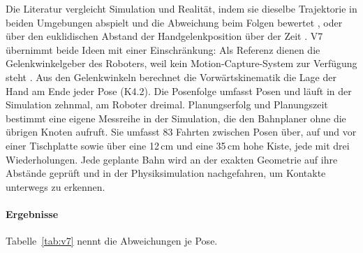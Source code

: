 Die Literatur vergleicht Simulation und Realität, indem sie dieselbe Trajektorie in beiden Umgebungen abspielt und die Abweichung beim Folgen bewertet \cite{He2025}, oder über den euklidischen Abstand der Handgelenkposition über der Zeit \cite{Collins2019}.
V7 übernimmt beide Ideen mit einer Einschränkung: Als Referenz dienen die Gelenkwinkelgeber des Roboters, weil kein Motion-Capture-System zur Verfügung steht .
Aus den Gelenkwinkeln berechnet die Vorwärtskinematik die Lage der Hand am Ende jeder Pose (K4.2).
Die Posenfolge umfasst  Posen und läuft in der Simulation zehnmal, am Roboter dreimal.
Planungserfolg und Planungszeit bestimmt eine eigene Messreihe in der Simulation, die den Bahnplaner ohne die übrigen Knoten aufruft.
Sie umfasst 83 Fahrten zwischen Posen über, auf und vor einer Tischplatte sowie über eine 12\,cm und eine 35\,cm hohe Kiste, jede mit drei Wiederholungen.
Jede geplante Bahn wird an der exakten Geometrie auf ihre Abstände geprüft und in der Physiksimulation nachgefahren, um Kontakte unterwegs zu erkennen.

\paragraph*{Ergebnisse}
Tabelle~\ref{tab:v7} nennt die Abweichungen je Pose.

